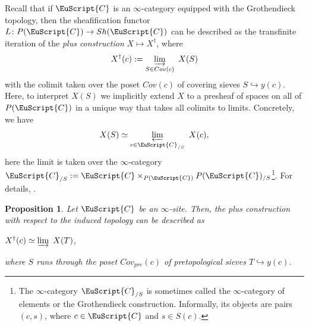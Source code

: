 \documentclass[oneside,a4paper]{amsart}
\newcommand{\euscr}[1]{\EuScript{#1}} %
\newcommand{\ccat}{\euscr{C}} %
\theoremstyle{plain}
\newtheorem{prop}[thm]{Proposition}
\theoremstyle{definition}
\theoremstyle{remark}
\begin{document}
Recall that if $\ccat$ is an $\infty$-category equipped with the Grothendieck topology, then the sheafification functor $L \colon P(\ccat) \rightarrow Sh(\ccat)$ can be described as the transfinite iteration of the \emph{plus construction} $X \mapsto X^{\dagger}$, where
\[
X^{\dagger}(c) := \varinjlim_{S \in Cov(c)} \ X(S)
\]
with the colimit taken over the poset $Cov(c)$ of covering sieves $S \hookrightarrow y(c)$. Here, to interpret $X(S)$ we implicitly extend $X$ to a presheaf of spaces on all of $P(\ccat)$ in a unique way that takes all colimits to limits. Concretely, we have
\[
X(S) \simeq \varprojlim _{c \in \ccat _{/S}} \ X(c),
\]
here the limit is taken over the $\infty$-category $\ccat_{/S} := \ccat \times_{P(\ccat)} P(\ccat)_{/S}$\footnote{The $\infty$-category $\ccat_{/S}$ is sometimes called the $\infty$-category of elements or the Grothendieck construction. Informally, its objects are pairs $(c, s)$, where $c \in \ccat$ and $s \in S(c)$.}. For details, \cite[\S6.2.2]{lurie_higher_topos_theory}.

\begin{prop}
\label{prop:plus_construction_in_terms_of_pretopology}
Let $\ccat$ be an $\infty$-site. Then, the plus construction with respect to the induced topology can be described as 

\begin{center}
$X^{\dagger}(c) \simeq \varinjlim \ X(T)$,
\end{center}
where $S$ runs through the poset $Cov_{pre}(c)$ of pretopological sieves $T \hookrightarrow y(c)$. 
\end{prop}
\end{document}
